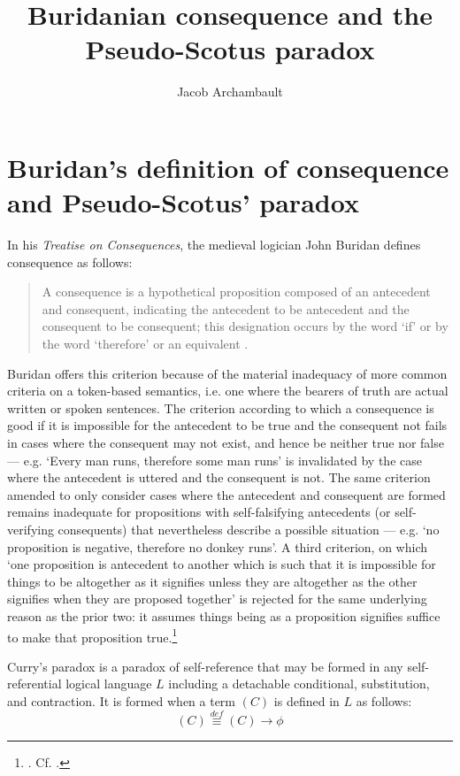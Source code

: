 \documentclass[]{article}
\title{Buridanian consequence and the Pseudo-Scotus paradox}
\author{Jacob Archambault}
\begin{document}
\maketitle

\begin{abstract}

\end{abstract}

\section{Buridan's definition of consequence and Pseudo-Scotus' paradox}
In his \textit{Treatise on Consequences}, the medieval logician John Buridan defines consequence as follows:
\begin{quote}
A consequence is a hypothetical proposition composed of an antecedent and consequent, indicating the antecedent to be antecedent and the consequent to be consequent; this designation occurs by the word `if' or by the word `therefore' or an equivalent \cite[TC I, 3, p. 67, alt.]{Buridan2015}.
\end{quote}

Buridan offers this criterion because of the material inadequacy of more common criteria on a token-based semantics, i.e. one where the bearers of truth are actual written or spoken sentences. The criterion according to which a consequence is good if it is impossible for the antecedent to be true and the consequent not fails in cases where the consequent may not exist, and hence be neither true nor false --- e.g. `Every man runs, therefore some man runs' is invalidated by the case where the antecedent is uttered and the consequent is not. The same criterion amended to only consider cases where the antecedent and consequent are formed remains inadequate for propositions with self-falsifying antecedents (or self-verifying consequents) that nevertheless describe a possible situation --- e.g. `no proposition is negative, therefore no donkey runs'. A third criterion, on which `one proposition is antecedent to another which is such that it is impossible for things to be altogether as it signifies unless they are altogether as the other signifies when they are proposed together' \cite[TC I, 3, p. 67]{Buridan2015} is rejected for the same underlying reason as the prior two: it assumes things being as a proposition signifies suffice to make that proposition true.\footnote{\cite[TC I, 1, p. 63]{Buridan2015}. Cf. \cite[pp. 854,  957-958]{BuridanKlimaSD}.}

Curry's paradox is a paradox of self-reference that may be formed in any self-referential logical language $L$ including a detachable conditional, substitution, and contraction. It is formed when a term $(C)$ is defined in $L$ as follows:
\begin{displaymath}
(C) \stackrel{def}{\equiv} (C) \rightarrow \phi
\end{displaymath}
\end{document}
